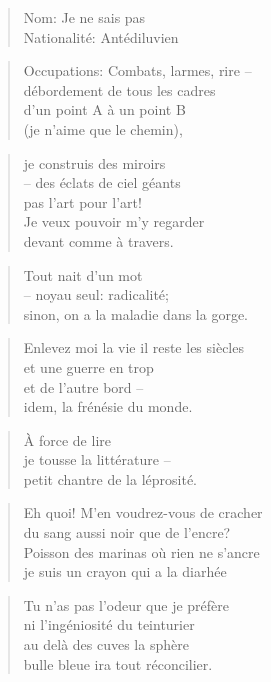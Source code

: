   \begin{verse}
    Nom: Je ne sais pas\\
    Nationalité: Antédiluvien
  \end{verse}
  \begin{verse}
    Occupations: Combats, larmes, rire --\\
    débordement de tous les cadres\\
    d’un point A à un point B\\
    (je n’aime que le chemin),
  \end{verse}
  \begin{verse}
    je construis des miroirs\\
    -- des éclats de ciel géants\\
    pas l’art pour l’art!\\
    Je veux pouvoir m’y regarder\\
    devant comme à travers.
  \end{verse}
  \begin{verse}
    Tout nait d’un mot\\
    -- noyau seul: radicalité;\\
    sinon, on a la maladie dans la gorge.
  \end{verse}
  \begin{verse}
    Enlevez moi la vie il reste les siècles\\
    et une guerre en trop\\
    et de l’autre bord --\\
    idem, la frénésie du monde.
  \end{verse}

  \begin{verse}
    À force de lire\\
    je tousse la littérature --\\
    petit chantre de la léprosité.
  \end{verse}
  \begin{verse}
    Eh quoi! M’en voudrez-vous de cracher\\
    du sang aussi noir que de l’encre?\\
    Poisson des marinas où rien ne s’ancre\\
    je suis un crayon qui a la diarhée\\
  \end{verse}
  \begin{verse}
  \end{verse}
  \begin{verse}
    Tu n’as pas l’odeur que je préfère\\
    ni l’ingéniosité du teinturier\\
    au delà des cuves la sphère\\
    bulle bleue ira tout réconcilier.
  \end{verse}

